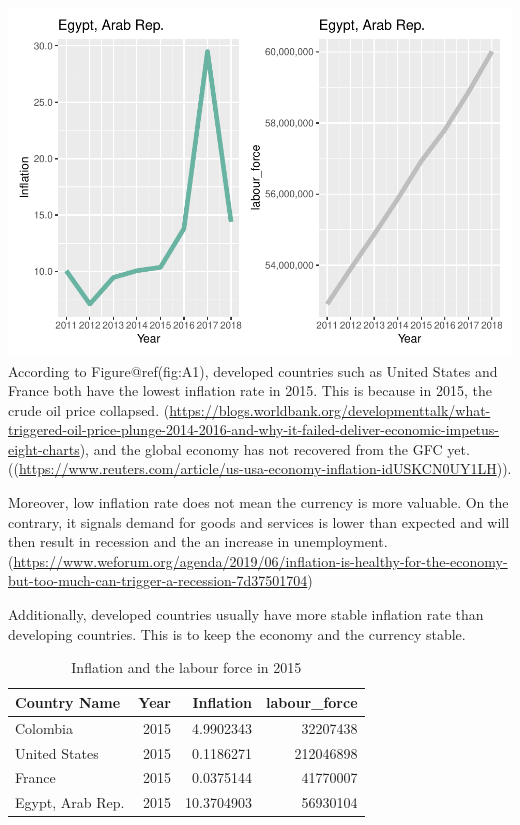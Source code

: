 \documentclass[
]{article}
\begin{document}
\includegraphics{The_Outsiders_5513_files/figure-latex/A1-4.pdf}
According to Figure@ref(fig:A1), developed countries such as United
States and France both have the lowest inflation rate in 2015. This is
because in 2015, the crude oil price collapsed.
(\url{https://blogs.worldbank.org/developmenttalk/what-triggered-oil-price-plunge-2014-2016-and-why-it-failed-deliver-economic-impetus-eight-charts}),
and the global economy has not recovered from the GFC yet.
((\url{https://www.reuters.com/article/us-usa-economy-inflation-idUSKCN0UY1LH})).

Moreover, low inflation rate does not mean the currency is more
valuable. On the contrary, it signals demand for goods and services is
lower than expected and will then result in recession and the an
increase in unemployment.
(\url{https://www.weforum.org/agenda/2019/06/inflation-is-healthy-for-the-economy-but-too-much-can-trigger-a-recession-7d37501704})

Additionally, developed countries usually have more stable inflation
rate than developing countries. This is to keep the economy and the
currency stable.

\begin{table}

\caption{\label{tab:A2}Inflation and the labour force in 2015}
\centering
\begin{tabular}[t]{l|r|r|r}
\hline
Country Name & Year & Inflation & labour\_force\\
\hline
Colombia & 2015 & 4.9902343 & 32207438\\
\hline
United States & 2015 & 0.1186271 & 212046898\\
\hline
France & 2015 & 0.0375144 & 41770007\\
\hline
Egypt, Arab Rep. & 2015 & 10.3704903 & 56930104\\
\hline
\end{tabular}
\end{table}
\end{document}
